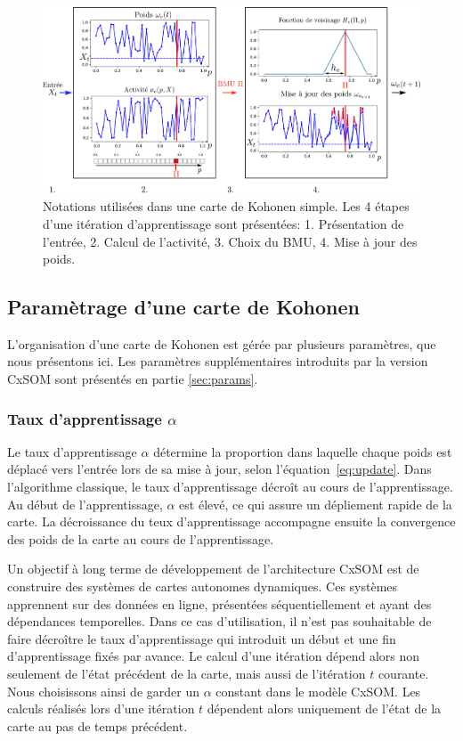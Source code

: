 \documentclass[../main]{subfiles}
\begin{document}
\begin{figure}
\centering
\includegraphics[width=\textwidth]{one_map_one_layer2.pdf}
\caption{Notations utilisées dans une carte de Kohonen simple. Les 4 étapes d'une itération d'apprentissage sont présentées: 1. Présentation de l'entrée, 2. Calcul de l'activité, 3. Choix du BMU, 4. Mise à jour des poids.}
\label{fig:one_map_not}
\end{figure}

\subsection{Paramètrage d'une carte de Kohonen}\label{sec:parametres_carte}

L'organisation d'une carte de Kohonen est gérée par plusieurs paramètres, que nous présentons ici.
Les paramètres supplémentaires introduits par la version CxSOM sont présentés en partie \ref{sec:params}.

\subsubsection{Taux d'apprentissage $\alpha$}

Le taux d'apprentissage $\alpha$ détermine la proportion dans laquelle chaque poids est déplacé vers l'entrée lors de sa mise à jour, selon l'équation~\ref{eq:update}. 
Dans l'algorithme classique, le taux d'apprentissage décroît au cours de l'apprentissage. Au début de l'apprentissage, $\alpha$ est élevé, ce qui assure un dépliement rapide de la carte. La décroissance du teux d'apprentissage accompagne ensuite la convergence des poids de la carte au cours de l'apprentissage.

Un objectif à long terme de développement de l'architecture CxSOM est de construire des systèmes de cartes autonomes dynamiques. Ces systèmes apprennent sur des données en ligne, présentées séquentiellement et ayant des dépendances temporelles. Dans ce cas d'utilisation, il n'est pas souhaitable de faire décroître le taux d'apprentissage qui introduit un début et une fin d'apprentissage fixés par avance. Le calcul d'une itération dépend alors non seulement de l'état précédent de la carte, mais aussi de l'itération $t$ courante. 
Nous choisissons ainsi de garder un $\alpha$ constant dans le modèle CxSOM.
Les calculs réalisés lors d'une itération $t$ dépendent alors uniquement de l'état de la carte au pas de temps précédent.
\end{document}
